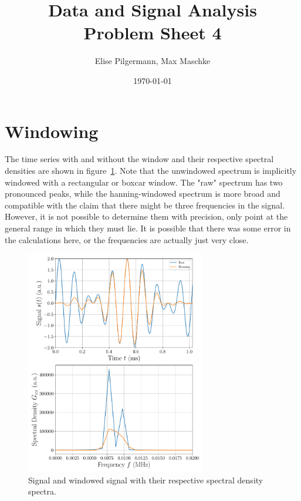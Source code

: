 \documentclass[a4paper,DIV=12,english]{scrartcl}
\title{Data and Signal Analysis\\Problem Sheet 4}
\author{Elise Pilgermann, Max Maschke}
\date{\today}
\begin{document}
\maketitle

\section{Windowing}
The time series with and without the window and their respective spectral densities are shown in figure~\ref{fig:window}. Note that the unwindowed spectrum is implicitly windowed with a rectangular or boxcar window. The "raw" spectrum has two pronounced peaks, while the hanning-windowed spectrum is more broad and compatible with the claim that there might be three frequencies in the signal. However, it is not possible to determine them with precision, only point at the general range in which they must lie. It is possible that there was some error in the calculations here, or the frequencies are actually just very close.

\begin{figure}[h]
    \centering
    \includegraphics[width=0.7\textwidth]{../signal.pdf}
    \caption{Signal and windowed signal with their respective spectral density spectra.}
    \label{fig:window}
\end{figure}

\FloatBarrier
\newpage
\end{document}
